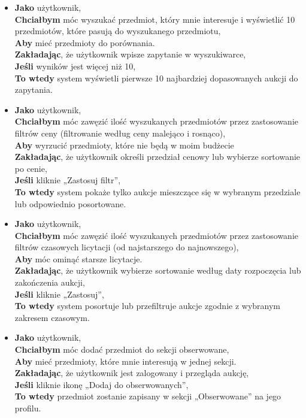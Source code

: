 \begin{itemize}
    \item \textbf{Jako} użytkownik,\\
          \textbf{Chciałbym} móc wyszukać przedmiot, który mnie interesuje i wyświetlić 10 przedmiotów, które pasują do wyszukanego przedmiotu,\\
          \textbf{Aby} mieć przedmioty do porównania.\\
          \textbf{Zakładając}, że użytkownik wpisze zapytanie w wyszukiwarce,\\
          \textbf{Jeśli} wyników jest więcej niż 10,\\
          \textbf{To wtedy} system wyświetli pierwsze 10 najbardziej dopasowanych aukcji do zapytania.\\
    \item \textbf{Jako} użytkownik,\\
          \textbf{Chciałbym} móc zawęzić ilość wyszukanych przedmiotów przez zastosowanie filtrów ceny (filtrowanie według ceny malejąco i rosnąco),\\
          \textbf{Aby} wyrzucić przedmioty, które nie będą w moim budżecie \\
          \textbf{Zakładając}, że użytkownik określi przedział cenowy lub wybierze sortowanie po cenie,\\
          \textbf{Jeśli} kliknie „Zastosuj filtr”,\\
          \textbf{To wtedy} system pokaże tylko aukcje mieszczące się w wybranym przedziale lub odpowiednio posortowane.\\
    \item \textbf{Jako} użytkownik,\\
          \textbf{Chciałbym} móc zawęzić ilość wyszukanych przedmiotów przez zastosowanie filtrów czasowych licytacji (od najstarszego do najnowszego), \\
          \textbf{Aby} móc ominąć starsze licytacje.\\
          \textbf{Zakładając}, że użytkownik wybierze sortowanie według daty rozpoczęcia lub zakończenia aukcji,\\
          \textbf{Jeśli} kliknie „Zastosuj”,\\
          \textbf{To wtedy} system posortuje lub przefiltruje aukcje zgodnie z wybranym zakresem czasowym.\\
    \item \textbf{Jako} użytkownik,\\
          \textbf{Chciałbym} móc dodać przedmiot do sekcji obserwowane,\\
          \textbf{Aby} mieć przedmioty, które mnie interesują w jednej sekcji.\\
          \textbf{Zakładając}, że użytkownik jest zalogowany i przegląda aukcję,\\
          \textbf{Jeśli} kliknie ikonę „Dodaj do obserwowanych”,\\
          \textbf{To wtedy} przedmiot zostanie zapisany w sekcji „Obserwowane” na jego profilu.\\


\end{itemize}

